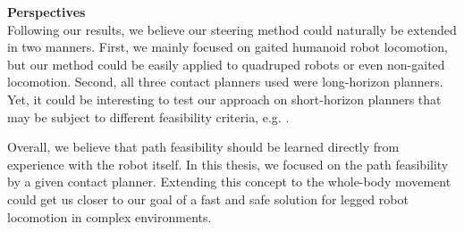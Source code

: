 
\hfill \break
\hfill \break

\noindent\textbf{Perspectives}\\

Following our results, we believe our steering method could naturally be extended in two manners.
First, we mainly focused on gaited humanoid robot locomotion, but our method could be easily applied to quadruped robots or even non-gaited locomotion.
Second, all three contact planners used were long-horizon planners. Yet, it could be interesting to test our approach on short-horizon planners that may be subject to different feasibility criteria, e.g. \cite{raibert_heuritics_1986, fanny_mip_solo}.


Overall, we believe that path feasibility should be learned directly from experience with the robot itself.
In this thesis, we focused on the path feasibility by a given contact planner. Extending this concept to the whole-body movement could get us closer to our goal of a fast and safe solution for legged robot locomotion in complex environments.

